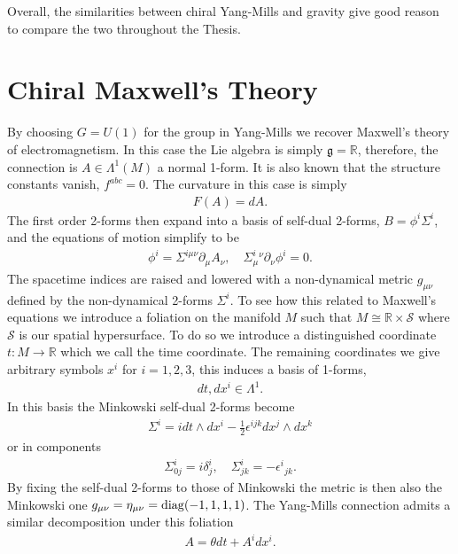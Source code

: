 \documentclass[10pt]{report}
\theoremstyle{definition}
\newcommand{\R}[0]{\mathbb{R}}
\newcommand{\spasurf}[0]{\mathcal{S}}
\begin{document}
Overall, the similarities between chiral Yang-Mills and gravity give good reason to compare the two throughout the Thesis.

\section{Chiral Maxwell's Theory}\label{sec:chiral-maxwell}
By choosing $G = U(1)$ for the group in Yang-Mills we recover Maxwell's theory of electromagnetism. In this case the Lie algebra is simply $\mathfrak{g} = \R$, therefore, the connection is $A \in \Lambda^1(M)$ a normal 1-form. It is also known that the structure constants vanish, $f^{abc} = 0$. The curvature in this case is simply
\begin{align}
    F(A) = dA.
\end{align}
The first order 2-forms then expand into a basis of self-dual 2-forms, $B = \phi^i \Sigma^i$, and the equations of motion simplify to be 
\begin{align}
    \phi^i = \Sigma^{i\mu\nu} \partial_\mu A_\nu, \quad \Sigma^i_\mu{}^\nu \partial_\nu \phi^i = 0.
\end{align}
The spacetime indices are raised and lowered with a non-dynamical metric $g_{\mu\nu}$ defined by the non-dynamical 2-forms $\Sigma^i$. To see how this related to Maxwell's equations we introduce a foliation on the manifold $M$ such that $M \cong \R \times \spasurf$ where $\spasurf$ is our spatial hypersurface. To do so we introduce a distinguished coordinate $t : M \rightarrow \R$ which we call the time coordinate. The remaining coordinates we give arbitrary symbols $x^i$ for $i = 1,2,3$, this induces a basis of 1-forms,
\begin{align}
    dt, dx^i \in \Lambda^1.
\end{align}
In this basis the Minkowski self-dual 2-forms become 
\begin{align}
    \Sigma^i = i dt \wedge dx^i - \frac{1}{2} \epsilon^{ijk} dx^j \wedge dx^k
\end{align}
or in components 
\begin{align}
    \Sigma^i_{0j} = i\delta^i_j, \quad \Sigma^i_{jk} = -\epsilon^i{}_{jk}.
\end{align}
By fixing the self-dual 2-forms to those of Minkowski the metric is then also the Minkowski one $g_{\mu\nu} = \eta_{\mu\nu} = {\rm diag}(-1,1,1,1)$. The Yang-Mills connection admits a similar decomposition under this foliation
\begin{align}
    A = \theta dt + A^i dx^i.
\end{align}
\end{document}

